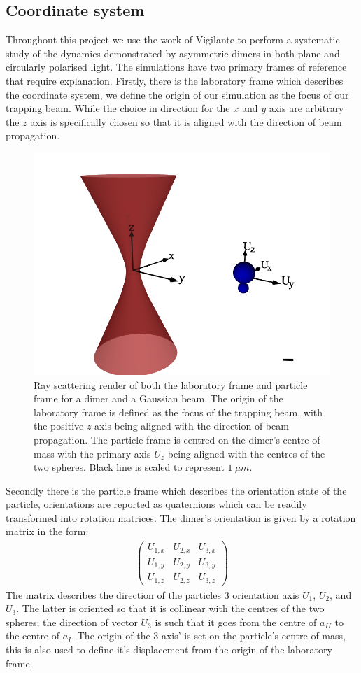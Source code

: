 \subsection{Coordinate system}
Throughout this project we use the work of Vigilante \cite{Vigilante2020} 
to perform a systematic study of the dynamics demonstrated by 
asymmetric dimers in both plane and circularly polarised light. 
The simulations have two primary frames of reference that require 
explanation. Firstly, there is the laboratory frame which 
describes the coordinate system, we define the origin of our 
simulation as the focus of our trapping beam. While the choice in 
direction for the $x$ and $y$ axis are arbitrary the $z$ axis is 
specifically chosen so that it is aligned with the direction of 
beam propagation. 
\begin{figure}[h!]
	\centering
	\includegraphics[width=0.6\linewidth]{lab_frame.png}
	\caption{Ray scattering render of both the laboratory frame and 
		particle frame for a dimer and a Gaussian beam. The origin 
		of the laboratory frame is defined as the focus of the 
		trapping beam, with the positive $z$-axis being aligned with 
		the direction of beam propagation. The particle frame is 
		centred on the dimer's centre of mass with the primary axis 
		$U_z$ being aligned with the centres of the two spheres. Black 
		line is scaled to represent $1\ \mu m$.}
	\label{fig:lab_frame} 
\end{figure} 

Secondly there is the particle frame which describes the orientation 
state of the particle, orientations are reported as quaternions which 
can be readily transformed into rotation matrices. The dimer's 
orientation is given by a rotation matrix in the form: 
\begin{align}
	\begin{pmatrix}
		U_{1,x} & U_{2,x} & U_{3,x} \\
		U_{1,y} & U_{2,y} & U_{3,y} \\
		U_{1,z} & U_{2,z} & U_{3,z}
	\end{pmatrix}
\end{align}
The matrix describes the direction of the particles 3 orientation 
axis $U_1$, $U_2$, and $U_3$. The latter is oriented so that it 
is collinear with the centres of the two spheres; the direction 
of vector $U_3$ is such that it goes from the centre of $a_{II}$ 
to the centre of $a_{I}$. The origin of the 3 axis' is set on the 
particle's centre of mass, this is also used to define it's 
displacement from the origin of the laboratory frame.

